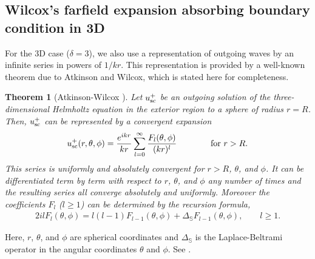 \documentclass[final,3p,times,12pt]{elsarticle}
\newtheorem{Theorem}{Theorem}
\newcommand{\usc}{u_{\rm sc}}
\newcommand{\Sph}{\mathbb{S}}
\begin{document}

\subsection{Wilcox's farfield expansion absorbing boundary condition in 3D} \label{Section.ABC3D}
For the 3D case ($\delta=3$), we also use a representation of outgoing waves by an infinite series in powers of $1/{kr}$. This representation is provided by a well-known theorem due to Atkinson and Wilcox, which is stated here for completeness.

\begin{Theorem}[Atkinson-Wilcox \cite{Wil-1956}]\label{Thm.Wilcox}
Let $\usc^{+}$ be an outgoing solution of the three-dimensional Helmholtz equation in the exterior region to a sphere of radius $r=R$. Then, $\usc^{+}$ can be represented by a convergent expansion
\begin{eqnarray}
\usc^{+}(r,\theta,\phi) = \frac{e^{ikr}}{kr}\sum_{l=0}^{\infty} \frac{F_l(\theta,\phi)}{(kr)^l} \qquad\qquad \text{for $r> R$}.\label{WilcoxExp}
\end{eqnarray}
This series is uniformly and absolutely convergent for $r>R$, $\theta$, and $\phi$. It can be differentiated  term by term with respect to $r$, $\theta$, and $\phi$ any number of times and the resulting series all converge absolutely and uniformly. Moreover the coefficients $F_l$ ($l \ge 1$) can be determined by the recursion formula,
\begin{eqnarray}
2 i l F_l(\theta,\phi) = l(l-1) F_{l-1}(\theta,\phi) + \Delta_{\Sph} F_{l-1}(\theta,\phi), \qquad l \geq 1. \label{AW-Recursive}
\end{eqnarray}


\end{Theorem}
\noindent Here, $r$, $\theta$, and $\phi$ are spherical coordinates and $\Delta_{\Sph}$ is the Laplace-Beltrami operator in the angular coordinates $\theta$ and $\phi$. See \cite{Bayliss01}.
\end{document}
